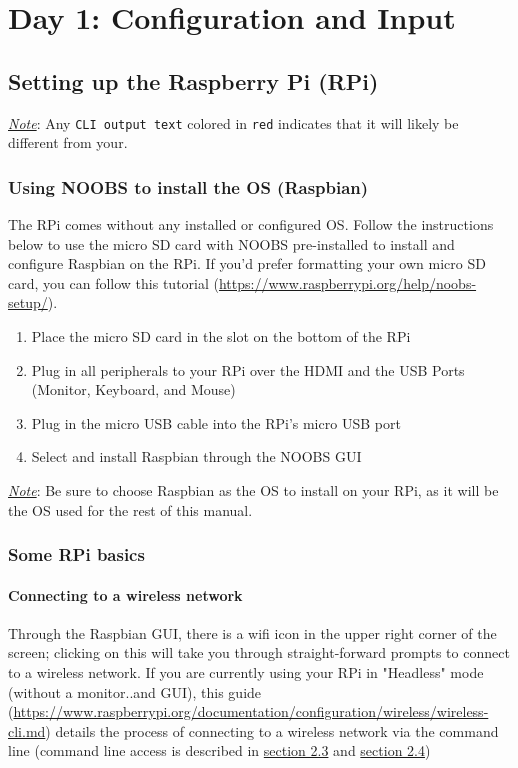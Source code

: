 \documentclass{article}
\newcommand{\outputi}[1]{\colorbox{light-gray}{\texttt{#1}}} %
\newcommand{\red}[1]{\textcolor{BrickRed}{#1}} %
\begin{document}
\section{Day 1: Configuration and Input}
\subsection{Setting up the Raspberry Pi (RPi)}
\underline{\textit{Note}}: Any \outputi{CLI output text} colored in \outputi{\red{red}} indicates that it will likely be different from your.
  \subsubsection{Using NOOBS to install the OS (Raspbian)}
  The RPi comes without any installed or configured OS. Follow the instructions below to use the micro SD card with NOOBS pre-installed to install and configure Raspbian on the RPi. If you'd prefer formatting your own micro SD card, you can follow this tutorial (\url{https://www.raspberrypi.org/help/noobs-setup/}).
  \begin{enumerate}
    \item Place the micro SD card in the slot on the bottom of the RPi
    \item Plug in all peripherals to your RPi over the HDMI and the USB Ports (Monitor, Keyboard, and Mouse)
    \item Plug in the micro USB cable into the RPi's micro USB port
    \item Select and install Raspbian through the NOOBS GUI
  \end{enumerate}
  \underline{\textit{Note}}: Be sure to choose Raspbian as the OS to install on your RPi, as it will be the OS used for the rest of this manual.

  \subsubsection{Some RPi basics}
    \paragraph{Connecting to a wireless network}
    Through the Raspbian GUI, there is a wifi icon in the upper right corner of the screen; clicking on this will take you through straight-forward prompts to connect to a wireless network. If you are currently using your RPi in "Headless" mode (without a monitor..and GUI), this guide (\url{https://www.raspberrypi.org/documentation/configuration/wireless/wireless-cli.md}) details the process of connecting to a wireless network via the command line (command line access is described in \hyperref[sec:connect-serial]{section 2.3} and \hyperref[sec:connect-ssh]{section 2.4})
\end{document}
